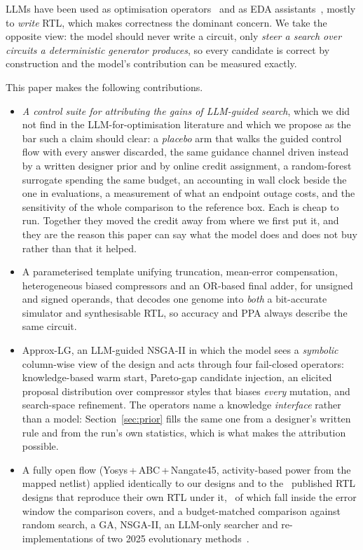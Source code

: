 \documentclass[acmsmall,review,anonymous]{acmart}
\begin{document}
LLMs have been used as optimisation operators~\cite{opro,funsearch,eoh} and as
EDA assistants~\cite{chateda,chipchat,verigen,gpt4aigchip}, mostly to
\emph{write} RTL, which makes correctness the dominant concern.  We take the
opposite view: the model should never write a circuit, only \emph{steer a
search over circuits a deterministic generator produces}, so every candidate is
correct by construction and the model's contribution can be measured exactly.

\noindent This paper makes the following contributions.
\begin{itemize}
\item \emph{A control suite for attributing the gains of LLM-guided search},
      which we did not find in the LLM-for-optimisation literature and which we
      propose as the bar such a claim should clear: a \emph{placebo} arm that
      walks the guided control flow with every answer discarded, the same
      guidance channel driven instead by a written designer prior and by online
      credit assignment, a random-forest surrogate spending the same budget, an
      accounting in wall clock beside the one in evaluations, a measurement of
      what an endpoint outage costs, and the sensitivity of the whole
      comparison to the reference box.  Each is cheap to run.  Together they
      moved the credit away from where we first put it, and they are the reason
      this paper can say what the model does and does not buy rather than that
      it helped.
\item A parameterised template unifying truncation, mean-error compensation,
      heterogeneous biased compressors and an OR-based final adder, for
      unsigned and signed operands, that decodes one genome into \emph{both} a
      bit-accurate simulator and synthesisable RTL, so accuracy and PPA always
      describe the same circuit.
\item Approx-LG, an LLM-guided NSGA-II in which the model sees a \emph{symbolic}
      column-wise view of the design and acts through four fail-closed
      operators: knowledge-based warm start, Pareto-gap candidate injection, an
      elicited proposal distribution over compressor styles that biases
      \emph{every} mutation, and search-space refinement.  The operators name a
      knowledge \emph{interface} rather than a model: Section~\ref{sec:prior}
      fills the same one from a designer's written rule and from the run's own
      statistics, which is what makes the attribution possible.
\item A fully open flow (Yosys\,+\,ABC\,+\,Nangate45, activity-based power from
      the mapped netlist) applied identically to our designs and to the
      \NlibVerified\ published RTL designs that reproduce their own RTL under
      it, \NlibUsed\ of which fall inside the error window the comparison
      covers, and a budget-matched comparison
      against random search, a GA, NSGA-II, an LLM-only searcher and
      re-imple\-men\-ta\-tions of two 2025 evolutionary
      methods~\cite{wen2025,devi2025}.
\end{itemize}
\end{document}
